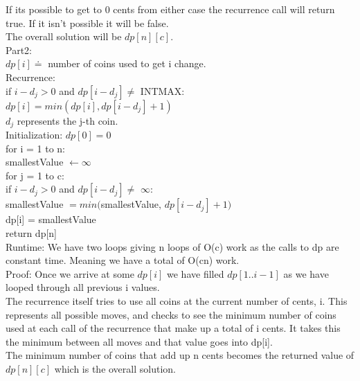 \documentclass[11pt,letter]{article}
\newcommand{\2}{\{0, 1\}}
\newcommand{\1}{\mathds{1}}
\theoremstyle{definition}
\begin{document}
If its possible to get to 0 cents from either case the recurrence call will return true. If it isn't possible it will be false.\\

The overall solution will be $dp[n][c]$. \\


Part2: \\

$dp[i] \doteq $ number of coins used to get i change.\\

Recurrence: \\
if $i - d_j > 0$ and $dp[i - d_j] \neq$ INTMAX:\\
\hspace*{3mm} $dp[i] = min(dp[i], dp[i - d_j] + 1)$\\
$d_j$ represents the j-th coin.\\


Initialization: $dp[0] = 0$ \\


for i = 1 to n: \\
\hspace*{3mm} smallestValue $\leftarrow \infty$ \\
\hspace*{3mm} for j = 1 to c: \\
\hspace*{6mm} if $i - d_j > 0$ and $dp[i - d_j] \neq$ $\infty$:\\
\hspace*{9mm} smallestValue $= min($smallestValue, $dp[i - d_j] + 1)$\\
\hspace*{3mm} dp[i] = smallestValue\\
return dp[n]\\

Runtime: We have two loops giving n loops of O(c) work as the calls to dp are constant time. Meaning we have a total of O(cn) work.\\

Proof: Once we arrive at some $dp[i]$ we have filled $dp[1..i-1]$ as we have looped through all previous i values. \\
The recurrence itself tries to use all coins at the current number of cents, i. This represents all possible moves, and checks to see the minimum number of coins used at each call of the recurrence that make up a total of i cents. It takes this the minimum between all moves and that value goes into dp[i].\\

The minimum number of coins that add up n cents becomes the returned value of $dp[n][c]$ which is the overall solution.\\
\end{document}

